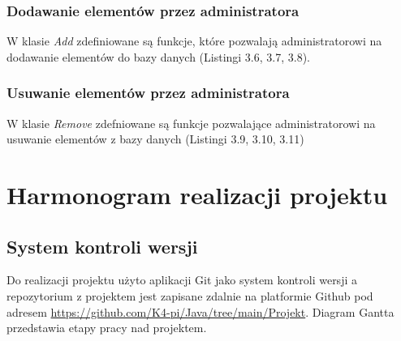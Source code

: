 \newpage


\subsection{Dodawanie elementów przez administratora}
W klasie \textit{Add} zdefiniowane są funkcje, które pozwalają administratorowi na dodawanie elementów do bazy danych (Listingi 3.6, 3.7, 3.8).

\newpage 


\newpage
\subsection{Usuwanie elementów przez administratora}
W klasie \textit{Remove} zdefniowane są funkcje pozwalające administratorowi na usuwanie elementów z bazy danych (Listingi 3.9, 3.10, 3.11)


\newpage 



\chapter{Harmonogram realizacji projektu}
\section{System kontroli wersji}
Do realizacji projektu użyto aplikacji Git jako system kontroli wersji 
a repozytorium z projektem jest zapisane zdalnie na platformie Github pod adresem
\url{https://github.com/K4-pi/Java/tree/main/Projekt}.
Diagram Gantta przedstawia etapy pracy nad projektem.

